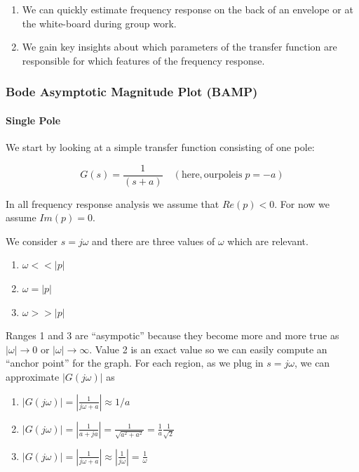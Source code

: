 \begin{enumerate}
  \item  We can quickly estimate frequency response on the back of an envelope or at the white-board during group work.
  \item  We gain key insights about which parameters of the transfer function are responsible for which features of the frequency response.
\end{enumerate}


\subsubsection{Bode Asymptotic Magnitude Plot (BAMP)}


\paragraph{Single Pole}

We start by looking at a simple transfer function consisting of one pole:

\[
G(s) = \frac{1}{(s+a)}\quad (\mathrm{here, our pole is }\; p=-a)
\]

In all frequency response analysis we assume that $Re(p) < 0$.  For now we assume $Im(p) = 0$.

We consider $s=j\omega$ and there are three values of $\omega$ which are relevant.

\begin{enumerate}
  \item  $\omega << |p|$
  \item  $\omega = |p|$
  \item  $\omega >> |p|$
\end{enumerate}

Ranges 1 and 3 are ``asympotic'' because they become more and more true as $|\omega| \to 0$ or $|\omega| \to \infty$. Value 2 is an exact value  so we can easily compute an ``anchor point'' for the graph.
For each region, as we plug in $s=j\omega$, we can approximate $|G(j\omega)|$ as

\begin{enumerate}
  \item  $|G(j\omega)| = \left | \frac{1}{j\omega+a} \right |  \approx 1/a$
  \item  $|G(j\omega)| = \left | \frac{1}{a+ja}    \right |       =    \frac {1} {\sqrt{a^2+a^2}} = \frac{1}{a}\frac{1}{\sqrt{2}}$
  \item  $|G(j\omega)| = \left | \frac{1}{j\omega+a} \right |  \approx \left | \frac{1}{j\omega} \right | = \frac{1}{\omega}$
\end{enumerate}

